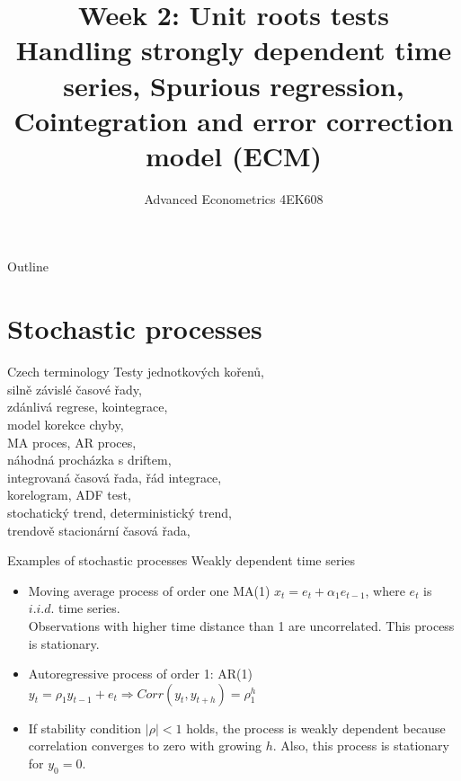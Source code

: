 \documentclass[usenames,dvipsnames]{beamer}
\title[Week1]{Week 2:  Unit roots tests \\ Handling strongly dependent time series, Spurious regression, Cointegration and error correction model (ECM)}
\author{Advanced Econometrics 4EK608}
\institute{Vysoká škola ekonomická v Praze}
\date{}
\begin{document}
 
\begin{frame}
  \titlepage
\end{frame}

\begin{frame}{Outline}
  \tableofcontents
\end{frame}

\section{Stochastic processes} 

\begin{frame}{Czech terminology}
Testy jednotkových kořenů, 
\\ silně závislé časové řady, 
\\ zdánlivá regrese, kointegrace,
\\ model korekce chyby, 
\\ MA proces, AR proces, 
\\ náhodná procházka s driftem,
\\ integrovaná časová řada, řád integrace,
\\ korelogram, ADF test, 
\\ stochatický trend, deterministický trend, 
\\ trendově stacionární časová řada, 
\end{frame}



\begin{frame}{Examples of stochastic processes}
Weakly dependent time series
  \vspace{0.4cm}
\begin{itemize}
  \item Moving average process of order one MA(1) $x_t=e_t+\alpha_1 e_{t-1}$, where $e_t$ is $\textit{i.i.d.}$ time series. \\Observations with higher time distance than 1 are uncorrelated. This process is stationary.
  \vspace{0.4cm}
  \item Autoregressive process of order 1: AR(1) \\ $y_t = \rho_1 y_{t-1} + e_t \Rightarrow Corr(y_t,y_{t+h})=\rho^h_1$
  \vspace{0.4cm}
  \item If stability condition $|\rho|<1$  holds, the process is weakly dependent because correlation converges to zero with growing $h$. Also, this process is stationary for $y_0 =0$.
  \vspace{0.4cm}
\end{itemize}

\end{frame}
\end{document}
